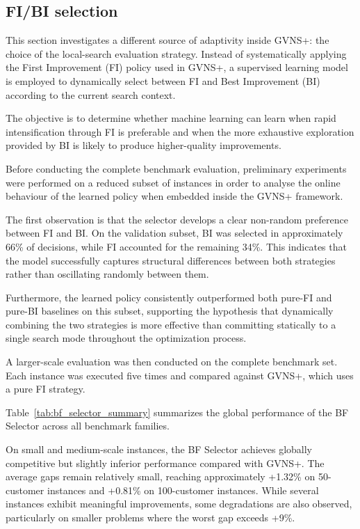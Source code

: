 \subsection{FI/BI selection}
This section investigates a different source of adaptivity inside GVNS+: the choice of the local-search evaluation strategy. Instead of systematically applying the First Improvement (FI) policy used in GVNS+, a supervised learning model is employed to dynamically select between FI and Best Improvement (BI) according to the current search context.

The objective is to determine whether machine learning can learn when rapid intensification through FI is preferable and when the more exhaustive exploration provided by BI is likely to produce higher-quality improvements.

Before conducting the complete benchmark evaluation, preliminary experiments were performed on a reduced subset of instances in order to analyse the online behaviour of the learned policy when embedded inside the GVNS+ framework.

The first observation is that the selector develops a clear non-random preference between FI and BI. On the validation subset, BI was selected in approximately 66\% of decisions, while FI accounted for the remaining 34\%. This indicates that the model successfully captures structural differences between both strategies rather than oscillating randomly between them.

Furthermore, the learned policy consistently outperformed both pure-FI and pure-BI baselines on this subset, supporting the hypothesis that dynamically combining the two strategies is more effective than committing statically to a single search mode throughout the optimization process.

A larger-scale evaluation was then conducted on the complete benchmark set. Each instance was executed five times and compared against GVNS+, which uses a pure FI strategy.

Table~\ref{tab:bf_selector_summary} summarizes the global performance of the BF Selector across all benchmark families.


On small and medium-scale instances, the BF Selector achieves globally competitive but slightly inferior performance compared with GVNS+. The average gaps remain relatively small, reaching approximately +1.32\% on 50-customer instances and +0.81\% on 100-customer instances. While several instances exhibit meaningful improvements, some degradations are also observed, particularly on smaller problems where the worst gap exceeds +9\%.

